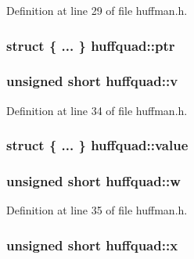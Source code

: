 Definition at line 29 of file huffman.\+h.

\subsubsection[{\texorpdfstring{ptr}{ptr}}]{\setlength{\rightskip}{0pt plus 5cm}struct \{ ... \}   huffquad\+::ptr}\hypertarget{unionhuffquad_ab07abb4ebfb64a6f8eb83942c68b9336}{}\label{unionhuffquad_ab07abb4ebfb64a6f8eb83942c68b9336}
\subsubsection[{\texorpdfstring{v}{v}}]{\setlength{\rightskip}{0pt plus 5cm}unsigned short huffquad\+::v}\hypertarget{unionhuffquad_a7dd703f536a1269c3e69a9a02af3a9d5}{}\label{unionhuffquad_a7dd703f536a1269c3e69a9a02af3a9d5}


Definition at line 34 of file huffman.\+h.

\subsubsection[{\texorpdfstring{value}{value}}]{\setlength{\rightskip}{0pt plus 5cm}struct \{ ... \}   huffquad\+::value}\hypertarget{unionhuffquad_ad738d41de7d930727a827cfe7a29f58c}{}\label{unionhuffquad_ad738d41de7d930727a827cfe7a29f58c}
\subsubsection[{\texorpdfstring{w}{w}}]{\setlength{\rightskip}{0pt plus 5cm}unsigned short huffquad\+::w}\hypertarget{unionhuffquad_aba9f3e52963ffdbf2cc485db947e4f11}{}\label{unionhuffquad_aba9f3e52963ffdbf2cc485db947e4f11}


Definition at line 35 of file huffman.\+h.

\subsubsection[{\texorpdfstring{x}{x}}]{\setlength{\rightskip}{0pt plus 5cm}unsigned short huffquad\+::x}\hypertarget{unionhuffquad_a7d679c557c749ada44575e67bb8e6cfa}{}\label{unionhuffquad_a7d679c557c749ada44575e67bb8e6cfa}


